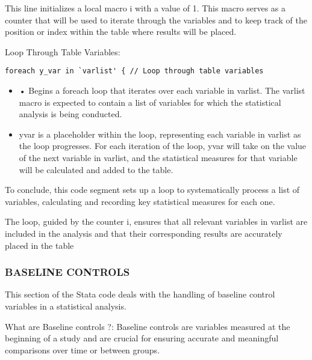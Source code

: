 \documentclass{article}
\begin{document}
\vspace{0.3cm}This line initializes a local macro i with a value of 1. This macro serves as a counter that will be used to iterate through the variables and to keep track of the position or index within the table where results will be placed.\newline

Loop Through Table Variables:


\begin{mdframed}
\begin{verbatim}
foreach y_var in `varlist' { // Loop through table variables
\end{verbatim}
\end{mdframed}


\begin{itemize}
    \item •	Begins a foreach loop that iterates over each variable in varlist. The varlist macro is expected to contain a list of variables for which the statistical analysis is being conducted.
    \item yvar is a placeholder within the loop, representing each variable in varlist as the loop progresses. For each iteration of the loop, yvar will take on the value of the next variable in varlist, and the statistical measures for that variable will be calculated and added to the table.
\end{itemize}

\vspace{0.3cm}To conclude, this code segment sets up a loop to systematically process a list of variables, calculating and recording key statistical measures for each one.\newline 

The loop, guided by the counter i, ensures that all relevant variables in varlist are included in the analysis and that their corresponding results are accurately placed in the table


\subsubsection{BASELINE CONTROLS}
\vspace{0.3cm}This section of the Stata code deals with the handling of baseline control variables in a statistical analysis. \newline

What are Baseline controls ?: Baseline controls are variables measured at the beginning of a study and are crucial for ensuring accurate and meaningful comparisons over time or between groups. \newline
\end{document}
